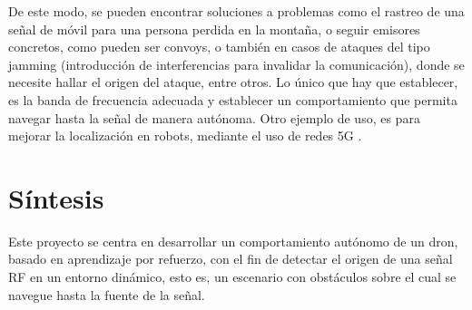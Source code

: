 De este modo, se pueden encontrar soluciones a problemas como el rastreo de una señal de móvil para una persona perdida en la montaña, o seguir emisores concretos, como pueden ser convoys, o también en casos de ataques del tipo jamming (introducción de interferencias para invalidar la comunicación), donde se necesite hallar el origen del ataque, entre otros. Lo único que hay que establecer, es la banda de frecuencia adecuada y establecer un comportamiento que permita navegar hasta la señal de manera autónoma. Otro ejemplo de uso, es para mejorar la localización en robots, mediante el uso de redes 5G \cite{s23010188}.

\section{Síntesis}
\label{subsec:sintesis}

Este proyecto se centra en desarrollar un comportamiento autónomo de un dron, basado en aprendizaje por refuerzo, con el fin de detectar el origen de una señal \ac{RF} en un entorno dinámico, esto es, un escenario con obstáculos sobre el cual se navegue hasta la fuente de la señal.
